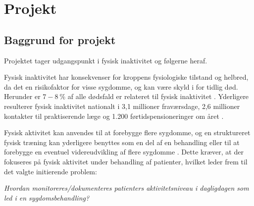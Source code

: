 \chapter{Projekt}
\section{Baggrund for projekt}
Projektet tager udgangspunkt i fysisk inaktivitet og følgerne heraf. 

Fysisk inaktivitet har konsekvenser for kroppens fysiologiske tilstand og helbred, da det en risikofaktor for visse sygdomme, og kan være skyld i for tidlig død. Herunder er $7-8~\%$ af alle dødsfald er relateret til fysisk inaktivitet \citep{aagaard2014,motionsraad2007}.  
Yderligere resulterer fysisk inaktivitet nationalt i 3,1 millioner fraværsdage, 2,6 millioner kontakter til praktiserende læge og 1.200 førtidspensioneringer om året \citep{christensen2012}. 

Fysisk aktivitet kan anvendes til at forebygge flere sygdomme, og en struktureret fysisk træning kan yderligere benyttes som en del af en behandling eller til at forebygge en eventuel videreudvikling af flere sygdomme \citep{motionsraad2007}. Dette kræver, at der fokuseres på fysisk aktivitet under behandling af patienter, hvilket leder frem til det valgte initierende problem:

\noindent
\begin{center}
\textit{Hvordan monitoreres/dokumenteres patienters aktivitetsniveau i dagligdagen som led i en sygdomsbehandling?}  
\end{center}
